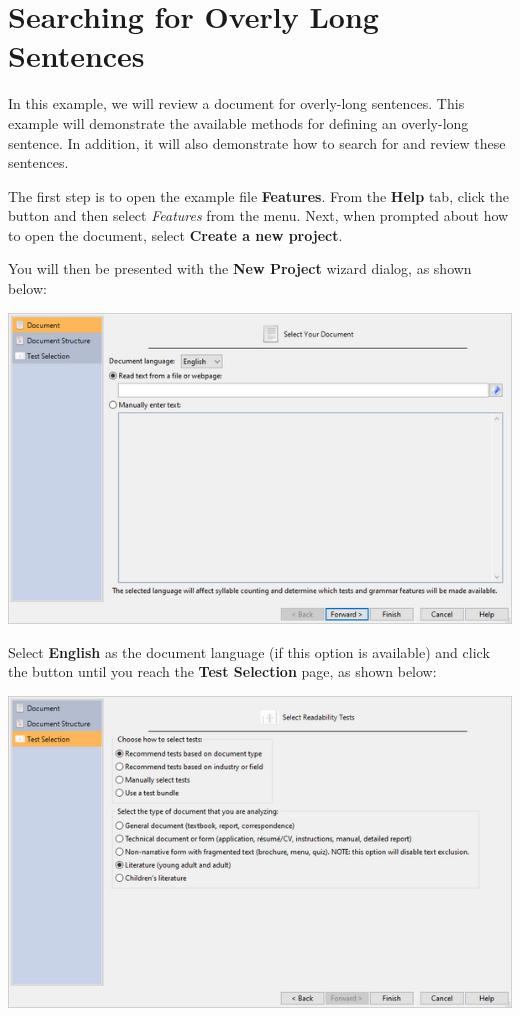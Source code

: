 \documentclass[
]{book}
\theoremstyle{definition}
\theoremstyle{definition}
\theoremstyle{definition}
\theoremstyle{definition}
\theoremstyle{remark}
\begin{document}
\newpage

\hypertarget{searching-for-overly-long-sentences}{%
\section{Searching for Overly Long Sentences}\label{searching-for-overly-long-sentences}}

In this example, we will review a document for overly-long sentences. This example will demonstrate the available methods for defining an overly-long sentence. In addition, it will also demonstrate how to search for and review these sentences.

The first step is to open the example file \textbf{Features}. From the \textbf{Help} tab, click the  button and then select \emph{Features} from the menu. Next, when prompted about how to open the document, select \textbf{Create a new project}.

You will then be presented with the \textbf{New Project} wizard dialog, as shown below:

\includegraphics{Images/wizard1.png}

Select \textbf{English} as the document language (if this option is available) and click the  button until you reach the \textbf{Test Selection} page, as shown below:

\includegraphics{Images/wizardreadabilitymethods.png}
\end{document}
